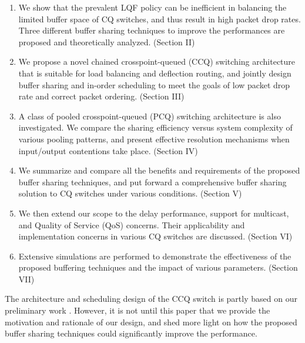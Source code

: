 \documentclass[journal,final,doublecolumn,10pt,twoside]{IEEEtranTCOM} \normalsize
\begin{document}
\begin{enumerate}
\item We show that the prevalent LQF policy can be inefficient in balancing the limited buffer space of CQ switches, and thus result in high packet drop rates. Three different buffer sharing techniques to improve the performances are proposed and theoretically analyzed. (Section II)

\item We propose a novel chained crosspoint-queued (CCQ) switching architecture that is suitable for load balancing and deflection routing, and jointly design buffer sharing and in-order scheduling to meet the goals of low packet drop rate and correct packet ordering. (Section III)

\item A class of pooled crosspoint-queued (PCQ) switching architecture is also investigated. We compare the sharing efficiency versus system complexity of various pooling patterns, and present effective resolution mechanisms when input/output contentions take place. (Section IV)

\item We summarize and compare all the benefits and requirements of the proposed buffer sharing techniques, and put forward a comprehensive buffer sharing solution to CQ switches under various conditions. (Section V)

\item We then extend our scope to the delay performance, support for multicast, and Quality of Service (QoS) concerns. Their applicability and implementation concerns in various CQ switches are discussed. (Section VI)

\item Extensive simulations are performed to demonstrate the effectiveness of the proposed buffering techniques and the impact of various parameters. (Section VII)
\end{enumerate}

The architecture and scheduling design of the CCQ switch is partly based on our preliminary work \cite{ancs}. However, it is not until this paper that we provide the motivation and rationale of our design, and shed more light on how the proposed buffer sharing techniques could significantly improve the performance.
\end{document}
